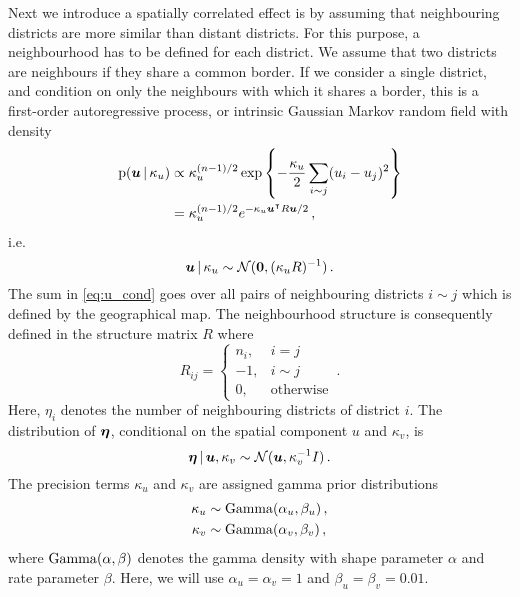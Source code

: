 Next we introduce a spatially correlated effect is by assuming that neighbouring districts are more similar than distant districts. For this purpose, a neighbourhood has to be defined for each district. We assume that two districts are neighbours if they share a common border. If we consider a single district, and condition on only the neighbours with which it shares a border, this is a first-order autoregressive process, or intrinsic Gaussian Markov random field with density
%
\begin{equation}
\label{eq:u_cond}
\begin{split}
    \mathrm{p}(\bm{u} \, | \, \kappa_u) &\propto \kappa_u^{(n-1)/2} \exp \left\{ -\frac{\kappa_u}{2} \sum_{i \sim j} (u_i - u_j)^2 \right\} \\
    &= \kappa_u^{(n-1)/2} e^{-\kappa_u {\bm{u}}^\intercal R \bm{u} / 2} \, ,
\end{split}
\end{equation}
%
i.e.
%
\begin{equation*}
    \bm{u} \, | \, \kappa_u \sim \mathcal{N}(\bm{0}, (\kappa_u R)^{-1}) \, .
\end{equation*}
%
The sum in \eqref{eq:u_cond} goes over all pairs of neighbouring districts $i \sim j$ which is defined by the geographical map. The neighbourhood structure is consequently defined in the structure matrix $R$ where
%
\begin{equation*}
    R_{ij} =
    \begin{cases}
    n_i, & i = j \\
    -1, & i \sim j \\
    0, & \text{otherwise}
    \end{cases} \, .
\end{equation*}
%
Here, $\eta_i$ denotes the number of neighbouring districts of district $i$. The distribution of $\bm{\eta}$, conditional on the spatial component $u$ and $\kappa_v$, is
%
\begin{equation*}
    \bm{\eta} \, | \, \bm{u}, \kappa_v \sim \mathcal{N}(\bm{u}, \kappa_v^{-1} I) \, .
\end{equation*}
%
The precision terms $\kappa_u$ and $\kappa_v$ are assigned gamma prior distributions
\begin{align*}
    \kappa_u &\sim \mathrm{Gamma}(\alpha_u, \beta_u) \, , \\
    \kappa_v &\sim \mathrm{Gamma}(\alpha_v, \beta_v) \, ,
\end{align*}
where $\mathrm{Gamma}(\alpha, \beta)$ denotes the gamma density with shape parameter $\alpha$ and rate parameter $\beta$. Here, we will use $\alpha_u = \alpha_v = 1$ and $\beta_u = \beta_v = 0.01$.
